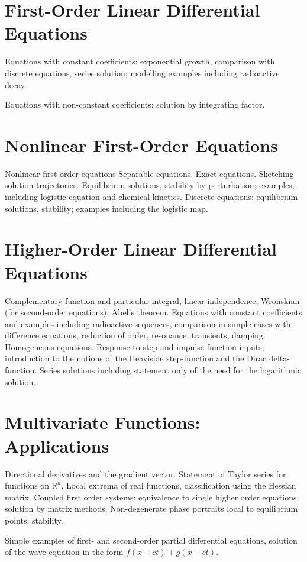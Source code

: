 \documentclass[a4]{scrartcl}
\begin{document}
\section{First-Order Linear Differential Equations}

Equations with constant coefficients: exponential growth, comparison with discrete equations, series solution; modelling examples including radioactive decay.

Equations with non-constant coefficients: solution by integrating factor.

\section{Nonlinear First-Order Equations}

Nonlinear first-order equations Separable equations. Exact equations. Sketching solution trajectories. Equilibrium solutions, stability by perturbation; examples, including logistic equation and chemical kinetics. Discrete equations: equilibrium solutions, stability; examples including the logistic map.

\section{Higher-Order Linear Differential Equations}

Complementary function and particular integral, linear independence, Wronskian (for second-order equations), Abel's theorem. Equations with constant coefficients and examples including radioactive sequences, comparison in simple cases with difference equations, reduction of order, resonance, transients, damping. Homogeneous equations. Response to step and impulse function inputs; introduction to the notions of the Heaviside step-function and the Dirac delta-function. Series solutions including statement only of the need for the logarithmic solution.

\section{Multivariate Functions: Applications}

Directional derivatives and the gradient vector. Statement of Taylor series for functions on $\mathbb{R}^{n}$. Local extrema of real functions, classification using the Hessian matrix. Coupled first order systems: equivalence to single higher order equations; solution by matrix methods. Non-degenerate phase portraits local to equilibrium points; stability.

Simple examples of first- and second-order partial differential equations, solution of the wave equation in the form $f(x+c t)+g(x-c t)$.
\end{document}
